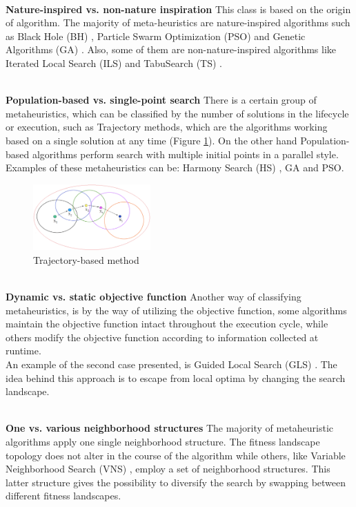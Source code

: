~\\
\textbf{Nature-inspired vs. non-nature inspiration }
This class is based on the origin of algorithm. The majority of meta-heuristics are nature-inspired algorithms such as Black Hole (BH) \cite{Rubio2016}, Particle Swarm Optimization (PSO) \cite{Duran:2010:CPS:1645454.1645859} and Genetic Algorithms (GA) \cite{DBLP:conf/icsi/CrawfordSPJPO14}. Also, some of them are non-nature-inspired algorithms like Iterated Local Search (ILS) \cite{DBLP:journals/networks/AringhieriGHS16} and TabuSearch (TS) \cite{DBLP:journals/eswa/SotoCGMP13}.

~\\
\textbf{Population-based vs. single-point search}
There is a certain group of metaheuristics, which can be classified by the number of solutions in the lifecycle or execution, such as Trajectory methods, which are the algorithms working based on a single solution at any time (Figure \ref{fig:trajectory-method}). On the other hand Population-based algorithms perform search with multiple initial points in a parallel style. Examples of these metaheuristics can be: Harmony Search (HS) \cite{DBLP:conf/ccece/Al-AjmiE14}, GA \cite{Aupetit2008} and PSO. 

\squeezeup
\begin{figure}[H]
	\centering
  \includegraphics[width=0.4\textwidth]{MarcoTeorico/imagenes/trajectory-mh.png}
	\caption{Trajectory-based method}\label{fig:trajectory-method}
\end{figure}
\squeezeup

~\\
\textbf{Dynamic vs. static objective function}
Another way of classifying metaheuristics, is by the way of utilizing the objective function, some algorithms maintain the objective function intact throughout the execution cycle, while others modify the objective function according to information collected at runtime.\\
An example of the second case presented, is Guided Local Search (GLS) \cite{DBLP:journals/eor/VansteenwegenSBO09}.  The idea behind this approach is to escape from local optima by changing the search landscape. 

~\\
\textbf{One vs. various neighborhood structures}
The majority of metaheuristic algorithms apply one single neighborhood structure. The fitness landscape topology does not alter in the course of the algorithm while others, like Variable Neighborhood Search (VNS) \cite{DBLP:journals/anor/SarasolaDSA16}, employ a set of neighborhood structures. This latter structure gives the possibility to diversify the search by swapping between different fitness landscapes.


